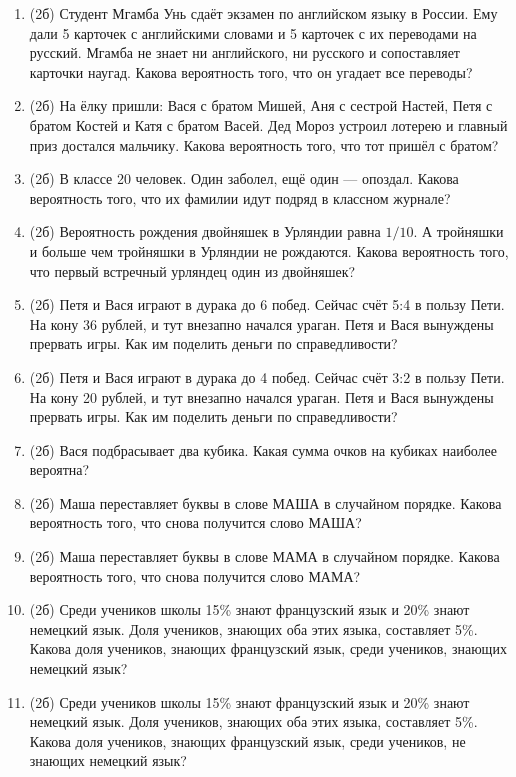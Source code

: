 \documentclass[a4paper, 12pt]{article}
\begin{document}
\newpage
\begin{enumerate}[resume]
  \item (2б) Студент Мгамба Унь сдаёт экзамен по английском языку в России. Ему дали 5 карточек с английскими словами и 5 карточек с их переводами на русский. Мгамба не знает ни английского, ни русского и сопоставляет карточки наугад. Какова вероятность того, что он угадает все переводы?
  \item (2б) На ёлку пришли: Вася с братом Мишей, Аня с сестрой Настей, Петя с братом Костей и Катя с братом Васей. Дед Мороз устроил лотерею и главный приз достался мальчику. Какова вероятность того, что тот пришёл с братом?
  \item (2б) В классе 20 человек. Один заболел, ещё один — опоздал. Какова вероятность того, что их фамилии идут подряд в классном журнале?
  \item (2б) Вероятность рождения двойняшек в Урляндии равна $1/10$. А тройняшки и больше чем тройняшки в Урляндии не рождаются. Какова вероятность того, что первый встречный урляндец один из двойняшек?
  \item (2б) Петя и Вася играют в дурака до 6 побед. Сейчас счёт 5:4 в пользу Пети. На кону 36 рублей, и тут внезапно начался ураган. Петя и Вася вынуждены прервать игры. Как им поделить деньги по справедливости?
  \item (2б) Петя и Вася играют в дурака до 4 побед. Сейчас счёт 3:2 в пользу Пети. На кону 20 рублей, и тут внезапно начался ураган. Петя и Вася вынуждены прервать игры. Как им поделить деньги по справедливости?
  \item (2б) Вася подбрасывает два кубика. Какая сумма очков на кубиках наиболее вероятна?
  \item (2б) Маша переставляет буквы в слове МАША в случайном порядке. Какова вероятность того, что снова получится слово МАША?
  \item (2б) Маша переставляет буквы в слове МАМА в случайном порядке. Какова вероятность того, что снова получится слово МАМА?
  \item (2б) Среди учеников школы 15\% знают французский язык и 20\% знают немецкий язык. Доля учеников, знающих оба этих языка, составляет 5\%. Какова доля учеников, знающих французский язык, среди учеников, знающих немецкий язык?
  \item (2б) Среди учеников школы 15\% знают французский язык и 20\% знают немецкий язык. Доля учеников, знающих оба этих языка, составляет 5\%. Какова доля учеников, знающих французский язык, среди учеников, не знающих немецкий язык?

\end{enumerate}
\end{document}
